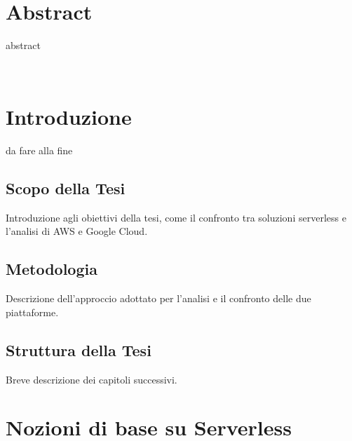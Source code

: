 \documentclass[12pt,a4paper,twoside]{book}
\begin{document}
\newpage

\newpage~\newpage
{}
\chapter*{Abstract}
abstract

\topmargin=-1cm
\tableofcontents
\thispagestyle{empty}
\listoftables
\thispagestyle{empty}
\listoffigures
\thispagestyle{empty}
\newpage~\newpage

\setcounter{chapter}{0}
\raggedbottom
\chapter{Introduzione} \label{chap:intro}
\pagestyle{plain}
\setcounter{page}{1}
da fare alla fine
\section{Scopo della Tesi}
Introduzione agli obiettivi della tesi, come il confronto tra soluzioni serverless e l'analisi di AWS e Google Cloud.

\section{Metodologia}
Descrizione dell'approccio adottato per l'analisi e il confronto delle due piattaforme.
 
\section{Struttura della Tesi}
Breve descrizione dei capitoli successivi.

\chapter{Nozioni di base su Serverless}
\end{document}
